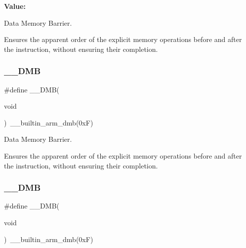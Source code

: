 {\bfseries Value\+:}
\begin{DoxyCode}{0}
\DoxyCodeLine{\textcolor{keywordflow}{do} \{\(\backslash\)}

\end{DoxyCode}


Data Memory Barrier. 

Ensures the apparent order of the explicit memory operations before and after the instruction, without ensuring their completion. \mbox{\label{group___c_m_s_i_s___core___instruction_interface_ga671101179b5943990785f36f8c1e2269}} 
\subsubsection{\texorpdfstring{\_\_DMB}{\_\_DMB}\hspace{0.1cm}{\footnotesize\ttfamily [2/3]}}
{\footnotesize\ttfamily \#define \+\_\+\+\_\+\+D\+MB(\begin{DoxyParamCaption}\item[{}]{void }\end{DoxyParamCaption})~\+\_\+\+\_\+builtin\+\_\+arm\+\_\+dmb(0x\+F)}



Data Memory Barrier. 

Ensures the apparent order of the explicit memory operations before and after the instruction, without ensuring their completion. \mbox{\label{group___c_m_s_i_s___core___instruction_interface_ga671101179b5943990785f36f8c1e2269}} 
\subsubsection{\texorpdfstring{\_\_DMB}{\_\_DMB}\hspace{0.1cm}{\footnotesize\ttfamily [3/3]}}
{\footnotesize\ttfamily \#define \+\_\+\+\_\+\+D\+MB(\begin{DoxyParamCaption}\item[{}]{void }\end{DoxyParamCaption})~\+\_\+\+\_\+builtin\+\_\+arm\+\_\+dmb(0x\+F)}



